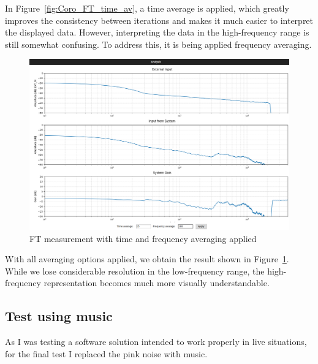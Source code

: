 In Figure~\ref{fig:Coro_FT_time_av}, a time average is applied, which greatly improves the consistency between iterations and makes it much easier to interpret the displayed data. However, interpreting the data in the high-frequency range is still somewhat confusing. To address this, it is being applied frequency averaging.

\begin{figure}[H]
	\centering
	\includegraphics[width=0.8
	\linewidth]{Figures/Coro_FT_WITH_av.png}
	\caption{FT measurement with time and frequency averaging applied}
	\label{fig:Coro_FT_av}
\end{figure}

With all averaging options applied, we obtain the result shown in Figure~\ref{fig:Coro_FT_av}. While we lose considerable resolution in the low-frequency range, the high-frequency representation becomes much more visually understandable.


\subsection{Test using music}

As I was testing a software solution intended to work properly in live situations, for the final test I replaced the pink noise with music.

